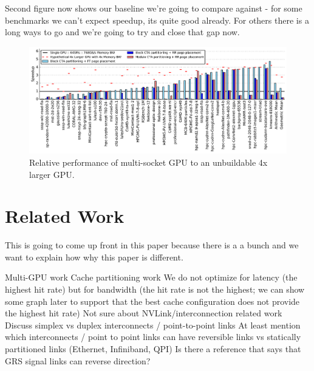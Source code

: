 Second figure now shows our baseline we're going to compare against - for some benchmarks we can't expect speedup, its quite good already.
For others there is a long ways to go and we're going to try and close that gap now.

\begin{figure}[tp]
    \centering
    \includegraphics[width=1\linewidth]{figures/plot_different_baselines.pdf}
    \caption{Relative performance of multi-socket GPU to an unbuildable 4x larger GPU.}
    \label{fig:motivation2}
\end{figure}

\section{Related Work}

This is going to come up front in this paper because there is a a bunch and we want to explain how
why this paper is different.

Multi-GPU work
Cache partitioning work
We do not optimize for latency (the highest hit rate) but for bandwidth (the hit rate is not the highest; we can show some graph later to support that the best cache configuration does not provide the highest hit rate)
Not sure about NVLink/interconnection related work
Discuss simplex vs duplex interconnects / point-to-point links
At least mention which interconnects / point to point links can have reversible links vs statically partitioned links (Ethernet, Infiniband, QPI)
Is there a reference that says that GRS signal links can reverse direction?


